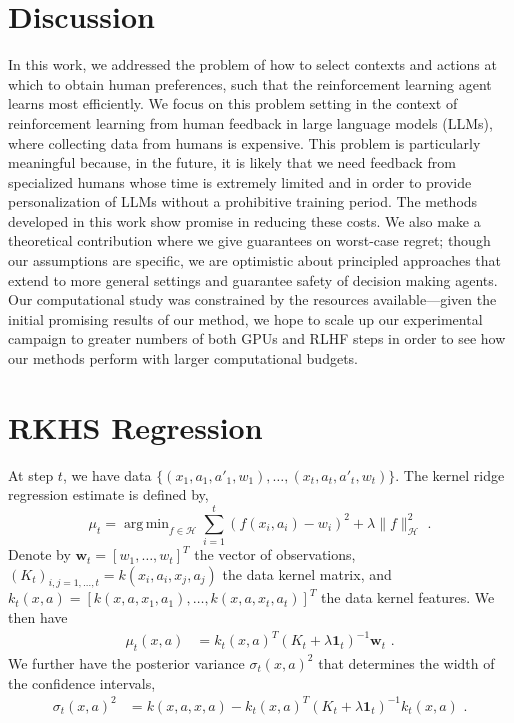 \documentclass{article} \usepackage{iclr2023_conference,times}
\DeclareMathOperator*{\argmin}{arg\,min}
\begin{document}
\section{Discussion}
\vspace{-3mm}
In this work, we addressed the problem of how to select contexts and actions at which to obtain human preferences, such that the reinforcement learning agent learns most efficiently.
We focus on this problem setting in the context of reinforcement learning from human feedback in large language models (LLMs), where collecting data from humans is expensive.
This problem is particularly meaningful because, in the future, it is likely that we need feedback from specialized humans whose time is extremely limited and in order to provide personalization of LLMs without a prohibitive training period.
The methods developed in this work show promise in reducing these costs.
We also make a theoretical contribution where we give guarantees on worst-case regret; though our assumptions are specific, we are optimistic about principled approaches that extend to more general settings and guarantee safety of decision making agents.
Our computational study was constrained by the resources available---given the initial promising results of our method, we hope to scale up our experimental campaign to greater numbers of both GPUs and RLHF steps in order to see how our methods perform with larger computational budgets.
%
 



\appendix
\newpage

\section{RKHS Regression}\label{a:rkhs_regression}

At step $t$, we have data $\{(x_1,a_1,a'_1, w_1), \dots, (x_t,a_t,a'_t, w_t)\}$. The kernel ridge regression estimate is defined by,
\begin{equation}
    \mu_t = \argmin_{ f \in \mathcal{H}} \sum_{i=1}^t (f(x_i,a_i) - w_i)^2 + \lambda\|f\|_{\mathcal{H}}^2 \text{ .}
\end{equation}
Denote by $\boldsymbol{w}_t = [w_1, \dots, w_t]^T$ the vector of observations, $(K_t)_{i,j=1,\dots,t} = k(x_i,a_i,x_j,a_j)$ the data kernel matrix, and $k_t(x,a) = [k(x,a,x_1,a_1), \dots, k(x,a,x_t,a_t)]^T$ the data kernel features. We then have
\begin{align}
    \mu_t(x,a) &= k_t(x,a)^T (K_t + \lambda \mathbf{1}_t)^{-1} \boldsymbol{w}_t \text{ .}
\end{align}
We further have the posterior variance $\sigma_t(x,a)^2$ that determines the width of the confidence intervals,
\begin{align}
    \sigma_t(x,a)^2 &= k(x,a,x,a) - k_t(x,a)^T(K_t + \lambda \mathbf{1}_t)^{-1} k_t(x,a) \text{ .}
\end{align}
\end{document}
